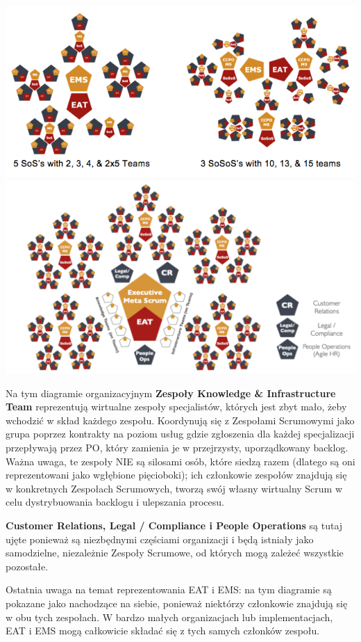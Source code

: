 \documentclass[12pt,a4paper,parskip=full]{scrartcl}
\begin{document}
\includegraphics[width=1.0\linewidth]{VariableSoS-R2.png}
\includegraphics[width=1.0\linewidth]{OrganizationalDiagram.png}

	Na tym diagramie organizacyjnym \textbf{Zespoły Knowledge \& Infrastructure Team} reprezentują wirtualne zespoły specjalistów, których jest zbyt mało, żeby wchodzić w skład każdego zespołu. Koordynują się z Zespołami Scrumowymi jako grupa poprzez kontrakty na poziom usług gdzie zgłoszenia dla każdej specjalizacji przepływają przez PO, który zamienia je w przejrzysty, uporządkowany backlog. Ważna uwaga, te zespoły NIE są silosami osób, które siedzą razem (dlatego są oni reprezentowani jako wgłębione pięcioboki); ich członkowie zespołów znajdują się w konkretnych Zespołach Scrumowych, tworzą swój własny wirtualny Scrum w celu dystrybuowania backlogu i ulepszania procesu.

\textbf{Customer Relations, Legal / Compliance i People Operations} są tutaj ujęte ponieważ są niezbędnymi częściami organizacji i będą istniały jako samodzielne, niezależnie Zespoły Scrumowe, od których mogą zależeć wszystkie pozostałe. 

Ostatnia uwaga na temat reprezentowania EAT i EMS: na tym diagramie są pokazane jako nachodzące na siebie, ponieważ niektórzy członkowie znajdują się w obu tych zespołach. W bardzo małych organizacjach lub implementacjach, EAT i EMS mogą całkowicie składać się z tych samych członków zespołu.
\end{document}
